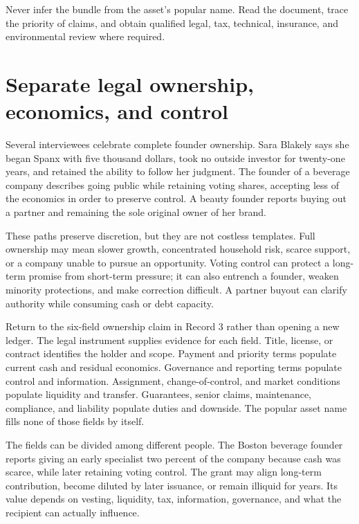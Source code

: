 Never infer the bundle from the asset's popular name. Read the document, trace
the priority of claims, and obtain qualified legal, tax, technical, insurance,
and environmental review where required.

\section[Legal ownership and control]{Separate legal ownership, economics, and control}

Several interviewees celebrate complete founder ownership. Sara Blakely says
she began Spanx with five thousand dollars, took no outside investor for
twenty-one years, and retained the ability to follow her judgment. The founder
of a beverage company describes going public while retaining voting shares,
accepting less of the economics in order to preserve control. A beauty founder
reports buying out a partner and remaining the sole original owner of her
brand.

These paths preserve discretion, but they are not costless templates. Full
ownership may mean slower growth, concentrated household risk, scarce support,
or a company unable to pursue an opportunity. Voting control can protect a
long-term promise from short-term pressure; it can also entrench a founder,
weaken minority protections, and make correction difficult. A partner buyout
can clarify authority while consuming cash or debt capacity.

Return to the six-field ownership claim in Record 3 rather than opening a new
ledger. The legal instrument supplies evidence for each field. Title, license,
or contract identifies the holder and scope. Payment and priority terms
populate current cash and residual economics. Governance and reporting terms
populate control and information. Assignment, change-of-control, and market
conditions populate liquidity and transfer. Guarantees, senior claims,
maintenance, compliance, and liability populate duties and downside. The
popular asset name fills none of those fields by itself.

The fields can be divided among different people. The Boston beverage founder
reports giving an early specialist two percent of the company because cash was
scarce, while later retaining voting control. The grant may align long-term
contribution, become diluted by later issuance, or remain illiquid for years.
Its value depends on vesting, liquidity, tax, information, governance, and what
the recipient can actually influence.


